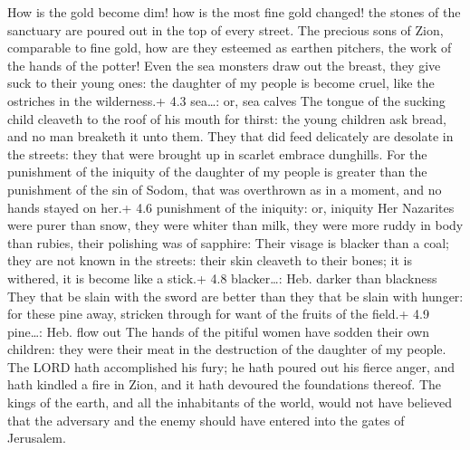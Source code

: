  How is the gold become dim! how is the most fine gold
changed! the stones of the sanctuary are poured out in the top of every
street.  The precious sons of Zion, comparable to fine gold,
how are they esteemed as earthen pitchers, the work of the hands of the
potter!  Even the sea monsters draw out the breast, they
give suck to their young ones: the daughter of my people is become
cruel, like the ostriches in the wilderness.+ 4.3 sea\ldots: or, sea
calves  The tongue of the sucking child cleaveth to the roof
of his mouth for thirst: the young children ask bread, and no man
breaketh it unto them.  They that did feed delicately are
desolate in the streets: they that were brought up in scarlet embrace
dunghills.  For the punishment of the iniquity of the
daughter of my people is greater than the punishment of the sin of
Sodom, that was overthrown as in a moment, and no hands stayed on her.+
4.6 punishment of the iniquity: or, iniquity  Her Nazarites
were purer than snow, they were whiter than milk, they were more ruddy
in body than rubies, their polishing was of sapphire:  Their
visage is blacker than a coal; they are not known in the streets: their
skin cleaveth to their bones; it is withered, it is become like a
stick.+ 4.8 blacker\ldots: Heb. darker than blackness  They
that be slain with the sword are better than they that be slain with
hunger: for these pine away, stricken through for want of the fruits of
the field.+ 4.9 pine\ldots: Heb. flow out  The hands of the
pitiful women have sodden their own children: they were their meat in
the destruction of the daughter of my people.  The LORD
hath accomplished his fury; he hath poured out his fierce anger, and
hath kindled a fire in Zion, and it hath devoured the foundations
thereof.  The kings of the earth, and all the inhabitants
of the world, would not have believed that the adversary and the enemy
should have entered into the gates of Jerusalem.


